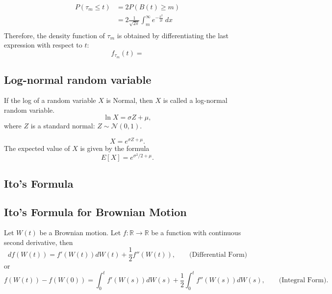 \documentclass{amsart}
\theoremstyle{plain}
\numberwithin{equation}{section}
\begin{document}
\begin{align}
P(\tau_m \leq t) &= 2 P(B(t) \geq m )\\
                 &= 2 \frac{1}{\sqrt{2\pi}} \int_{m}^{\infty} e^{-\frac{x^2}{2t}} \: dx\\								
\end{align}
Therefore, the density function of
$\tau_m$ is obtained by differentiating the last expression 
with respect to $t$:
\begin{equation}
f_{\tau_m} (t) = 
\end{equation}

\subsection*{Log-normal random variable}
If the log of a random variable $X$ is 
Normal, then $X$ is called a log-normal
random variable.
\begin{equation}
\ln X = \sigma Z + \mu,
\end{equation}
where $Z$ is a
standard normal: $Z \sim \mathcal{N}(0, 1)$.

\begin{equation}
X = e^{\sigma Z + \mu}.
\end{equation}
The expected value of $X$ is 
given by the formula
\begin{equation}
E[X] = e^{\sigma^2/2 + \mu}.
\end{equation}

\subsection{Ito's Formula}
\subsection{Ito's Formula for Brownian Motion}
Let $W(t)$ be a Brownian motion. Let $f: \mathbb{R} \to \mathbb{R}$ 
be a function with continuous second derivative, 
then 
\begin{equation}
df(W(t)) = f'(W(t)) dW(t) + \frac{1}{2} f''(W(t)),
\qquad \mbox{(Differential Form)}
\end{equation}
or
\begin{equation}
f(W(t)) - f(W(0)) = \int_0^t f'(W(s)) dW(s) + 
\frac{1}{2} \int_0^t f''(W(s)) dW(s),
\qquad \mbox{(Integral Form)}.
\end{equation}
\end{document}
